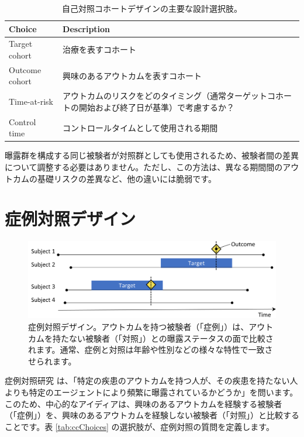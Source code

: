 \documentclass[
  11pt]{book}
\theoremstyle{definition}
\theoremstyle{definition}
\theoremstyle{definition}
\theoremstyle{definition}
\theoremstyle{remark}
\begin{document}
\begin{table}
\centering
\caption{\label{tab:sccChoices}自己対照コホートデザインの主要な設計選択肢。}
\centering
\begin{tabular}[t]{l>{\raggedright\arraybackslash}p{9cm}}
\toprule
Choice & Description\\
\midrule
Target cohort & 治療を表すコホート\\
Outcome cohort & 興味のあるアウトカムを表すコホート\\
Time-at-risk & アウトカムのリスクをどのタイミング（通常ターゲットコホートの開始および終了日が基準）で考慮するか？\\
Control time & コントロールタイムとして使用される期間\\
\bottomrule
\end{tabular}
\end{table}

曝露群を構成する同じ被験者が対照群としても使用されるため、被験者間の差異について調整する必要はありません。ただし、この方法は、異なる期間間のアウトカムの基礎リスクの差異など、他の違いには脆弱です。

\section{症例対照デザイン}\label{ux75c7ux4f8bux5bfeux7167ux30c7ux30b6ux30a4ux30f3}


\begin{figure}[h]

{\centering \includegraphics[width=0.9\linewidth]{images/PopulationLevelEstimation/caseControl} 

}

\caption{症例対照デザイン。アウトカムを持つ被験者（「症例」）は、アウトカムを持たない被験者（「対照」）との曝露ステータスの面で比較されます。通常、症例と対照は年齢や性別などの様々な特性で一致させられます。}\label{fig:caseControl}
\end{figure}

症例対照研究 \citep{vandenbroucke_2012} は、「特定の疾患のアウトカムを持つ人が、その疾患を持たない人よりも特定のエージェントにより頻繁に曝露されているかどうか」を問います。このため、中心的なアイディアは、興味のあるアウトカムを経験する被験者（「症例」）を、興味のあるアウトカムを経験しない被験者（「対照」）と比較することです。表 \ref{tab:ccChoices} の選択肢が、症例対照の質問を定義します。  
\end{document}
